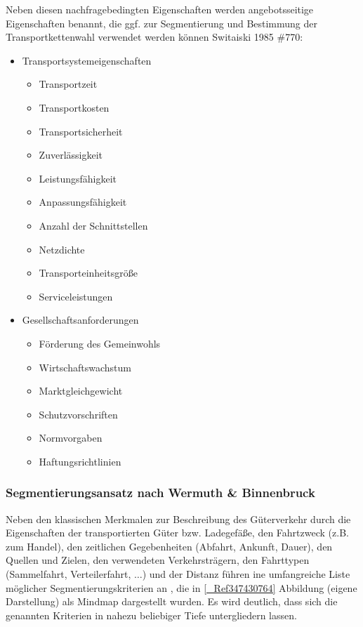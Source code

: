 % 
Neben diesen nachfragebedingten Eigenschaften werden angebotsseitige Eigenschaften benannt, die ggf. zur Segmentierung und Bestimmung der Transportkettenwahl verwendet werden können {Switaiski 1985 \#770}:~\\

\begin{itemize}
%
   \item Transportsystemeigenschaften
\begin{itemize}
% 
   \item Transportzeit
   \item Transportkosten
   \item Transportsicherheit
   \item Zuverlässigkeit
   \item Leistungsfähigkeit
   \item Anpassungsfähigkeit
   \item Anzahl der Schnittstellen
   \item Netzdichte
   \item Transporteinheitsgröße
   \item Serviceleistungen
%
\end{itemize}
 
   \item Gesellschaftsanforderungen
\begin{itemize}
% 
   \item Förderung des Gemeinwohls
   \item Wirtschaftswachstum
   \item Marktgleichgewicht
   \item Schutzvorschriften
   \item Normvorgaben
   \item Haftungsrichtlinien
%
\end{itemize}

%
\end{itemize}
 

% 
\subsubsection{Segmentierungsansatz nach Wermuth \& Binnenbruck}
\label{_Toc366766091}
\label{_Toc366775285}
Neben den klassischen Merkmalen zur Beschreibung des Güterverkehr durch die Eigenschaften der transportierten Güter bzw. Ladegefäße, den Fahrtzweck (z.B. zum Handel), den zeitlichen Gegebenheiten (Abfahrt, Ankunft, Dauer), den Quellen und Zielen, den verwendeten Verkehrsträgern, den Fahrttypen (Sammelfahrt, Verteilerfahrt, $\ldots$) und der Distanz  \autocites[][]{bib.820} führen  \citeauthor{bib.820} ine umfangreiche Liste möglicher Segmentierungskriterien an  \autocites[][]{bib.820}, die in \autoref{_Ref347430764} Abbildung  (eigene Darstellung) als Mindmap dargestellt wurden. Es wird deutlich, dass sich die genannten Kriterien in nahezu beliebiger Tiefe untergliedern lassen.~\\

